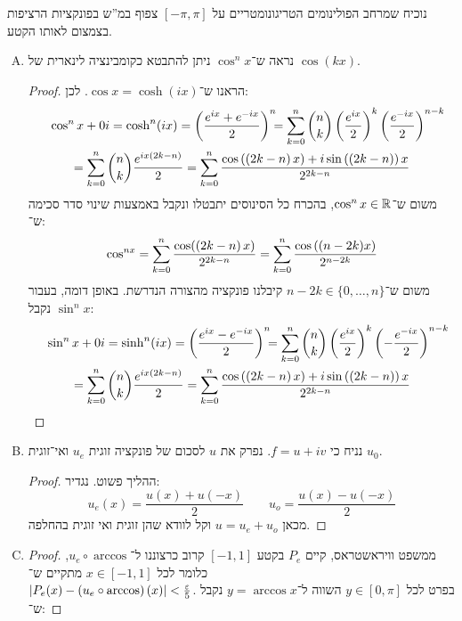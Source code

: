 \documentclass[]{../../../../tex/classes/homework}
\begin{document}
	\section{}
	נוכיח שמרחב הפולינומים הטריגונומטריים על $[-\pi, \pi]$ צפוף במ''ש בפונקציות הרציפות בצמצום לאותו הקטע. 
	\begin{enumerate}[(A)]
		\item נראה ש־$\cos^{n}x$ ניתן להתבטא כקומבינציה לינארית של $\cos(kx)$. 
		\begin{proof}
			הראנו ש־$\cos x = \cosh(ix)$. לכן: 
			\begin{multline*}
				\cos^{n}x + 0i = \cosh^{n}(ix) = \cl{\frac{e^{ix} + e^{-ix}}{2}}^{n} \!\!\!= \sum_{k = 0}^{n}\binom{n}{k}\cl{\frac{e^{ix}}{2}}^{k}\cl{\frac{e^{-ix}}{2}}^{n - k} \dequad \\
				= \sum_{k = 0}^{n}\binom{n}{k}{\frac{e^{ix\cl{2k - n}}}{2}} = \sum_{k = 0}^{n}\frac{\cos\cl{\cl{2k - n}x} + i\sin\cl{\cl{2k - n}}x}{2^{2k - n}}
			\end{multline*}
			משום ש־$\cos^{n}x \in \mathbb{R}$, בהכרח כל הסינוסים יתבטלו ונקבל באמצעות שינוי סדר סכימה ש־: 
			\[ \cos^{nx} = \sum_{k = 0}^{n}\frac{\cos(\left ( 2k - n \right )x)}{2^{2k - n}} = \sum_{k = 0}^{n}\frac{\cos\left ( (n - 2k)x \right )}{2^{n - 2k}} \]
			משום ש־$n - 2k \in \{0, \dots, n\}$ קיבלנו פונקציה מהצורה הנדרשת. באופן דומה, בעבור $\sin^{n}x$ נקבל: 
			\begin{multline*}
				\sin^{n}x + 0i = \sinh^{n}(ix) = \cl{\frac{e^{ix} - e^{-ix}}{2}}^{n} \!\!\!= \sum_{k = 0}^{n}\binom{n}{k}\cl{\frac{e^{ix}}{2}}^{k}\cl{-\frac{e^{-ix}}{2}}^{n - k} \dequad \\
				= \sum_{k = 0}^{n}\binom{n}{k}{\frac{e^{ix\cl{2k - n}}}{2}} = \sum_{k = 0}^{n}\frac{\cos\cl{\cl{2k - n}x} + i\sin\cl{\cl{2k - n}}x}{2^{2k - n}}
			\end{multline*}
		\end{proof}
		\item נניח כי $f = u + iv$. נפרק את $u$ לסכום של פונקציה זוגית $u_e$ ואי־זוגית $u_0$. 
		\begin{proof}
			ההליך פשוט. נגדיר: 
			\[ u_e(x) = \frac{u(x) + u(-x)}{2}\quad\quad u_o = \frac{u(x) - u(-x)}{2} \]
			מכאן $u = u_e + u_o$ וקל לוודא שהן זוגית ואי זוגית בהחלפה. 
		\end{proof}
		\item \begin{proof}
			ממשפט וויראשטראס, קיים $P_e$ בקטע $[-1, 1]$ קרוב כרצוננו ל־$u_e \circ \arccos$, כלומר לכל $x \in [-1, 1]$ מתקיים ש־\\$\sof{P_e(x)- \cl{u_e \circ \arccos}(x)} < \frac{\eg}{5}$. בפרט לכל $y \in [0, \pi]$ השווה ל־$y = \arccos x$ נקבל ש־: 

\end{proof}
\end{enumerate}
\end{document}
